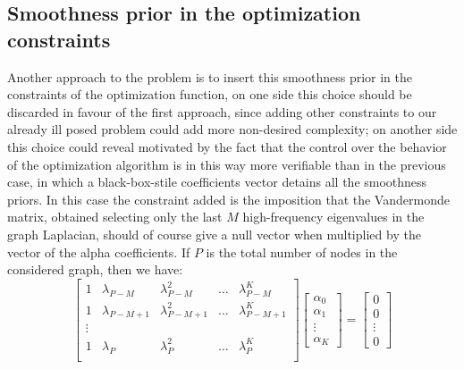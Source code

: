 \subsection{Smoothness prior in the optimization constraints}
Another approach to the problem is to insert this smoothness prior in the constraints of the optimization function, on one side this choice should be discarded in favour of the first approach, since adding other constraints to our already ill posed problem could add more non-desired complexity; on another side this choice could reveal motivated by the fact that the control over the behavior of the optimization algorithm is in this way more verifiable than in the previous case, in which a black-box-stile coefficients vector detains all the smoothness priors. In this case the constraint added is the imposition that the Vandermonde matrix, obtained selecting only the last $M$ high-frequency eigenvalues in the graph Laplacian, should of course give a null vector when multiplied by the vector of the alpha coefficients. If $P$ is the total number of nodes in the considered graph, then we have:
\begin{equation}
  \begin{bmatrix}
    1 & \lambda_{P-M} & \lambda_{P-M}^2 & \dots & \lambda_{P-M}^{K} \\
    1 & \lambda_{P-M+1} & \lambda_{P-M+1}^2 & \dots & \lambda_{P-M+1}^{K} \\
    \vdots & & \\
    1 & \lambda_P & \lambda_P^2 & \dots & \lambda_P^K \\
\end{bmatrix}
\begin{bmatrix}
  \alpha_0 \\
  \alpha_1 \\
  \vdots \\
  \alpha_K
\end{bmatrix}
=
\begin{bmatrix}
  0\\
  0\\
  \vdots\\
  0
\end{bmatrix}
\end{equation}

